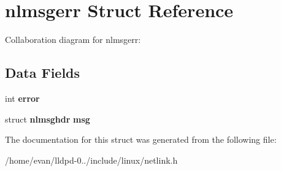 \section{nlmsgerr \-Struct \-Reference}
\label{structnlmsgerr}


\-Collaboration diagram for nlmsgerr\-:
\subsection*{\-Data \-Fields}
\begin{DoxyCompactItemize}
\item 
int {\bfseries error}\label{structnlmsgerr_a11614f44ef4d939bdd984953346a7572}

\item 
struct {\bf nlmsghdr} {\bfseries msg}\label{structnlmsgerr_abb95665533bce2204d96947be105263f}

\end{DoxyCompactItemize}


\-The documentation for this struct was generated from the following file\-:\begin{DoxyCompactItemize}
\item 
/home/evan/lldpd-\/0../include/linux/netlink.\-h\end{DoxyCompactItemize}
